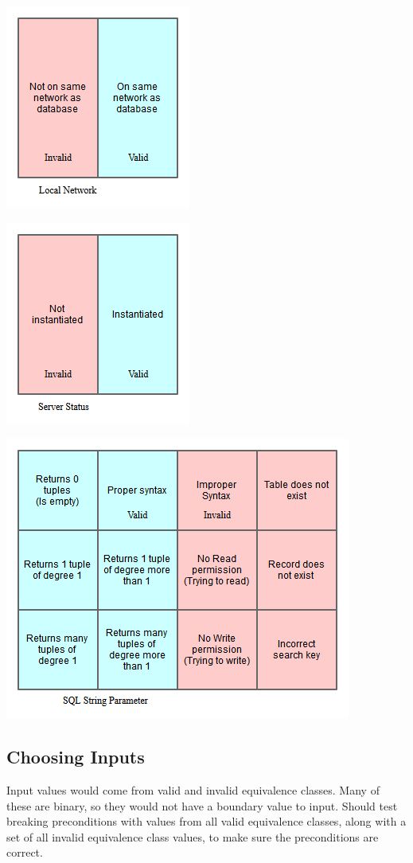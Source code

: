 \documentclass{article}
\begin{document}
\centerline{\includegraphics[scale=1]{../images/EquivalenceClass_LAN}}
\centerline{\includegraphics[scale=1]{../images/EquivalenceClass_Server}}
\centerline{\includegraphics[scale=1]{../images/EquivalenceClass_SQL}}

\subsection{Choosing Inputs}
Input values would come from valid and invalid equivalence classes.  Many of these are binary, so they would not have a boundary value to input.  Should test breaking preconditions with values from all valid equivalence classes, along with a set of all invalid equivalence class values, to make sure the preconditions are correct.
\end{document}

